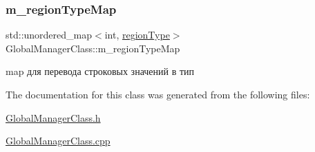 \subsubsection{\texorpdfstring{m\+\_\+region\+Type\+Map}{m\_regionTypeMap}}
{\footnotesize\ttfamily std\+::unordered\+\_\+map$<$int, \hyperlink{class_global_manager_class_a794b4a5298c61f8d25d9da44b7826857}{region\+Type}$>$ Global\+Manager\+Class\+::m\+\_\+region\+Type\+Map\hspace{0.3cm}{\ttfamily [private]}}



map для перевода строковых значений в тип 



The documentation for this class was generated from the following files\+:\begin{DoxyCompactItemize}
\item 
\hyperlink{_global_manager_class_8h}{Global\+Manager\+Class.\+h}\item 
\hyperlink{_global_manager_class_8cpp}{Global\+Manager\+Class.\+cpp}\end{DoxyCompactItemize}
